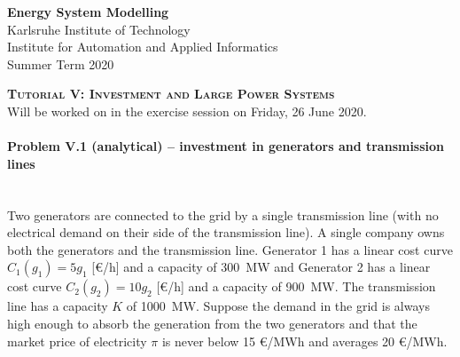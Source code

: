 \documentclass[11pt,a4paper,fleqn]{scrartcl}
\begin{document}
\begin{flushright}
 \textbf{Energy System Modelling }\\
 {\small Karlsruhe Institute of Technology}\\
 {\small Institute for Automation and Applied Informatics}\\
 {\small Summer Term 2020}\\
\end{flushright}

 
 \vspace{-0.5em}
 \hrulefill
 \vspace{0.3em}

\begin{center}
 \textbf{\textsc{\Large Tutorial V: Investment and Large Power Systems}}\\
 \small Will be worked on in the exercise session on Friday, 26 June 2020.\\[1.5em]
\end{center}

\vspace{-0.5em}
\hrulefill
\vspace{0.8em}

\vspace{1em}

\paragraph{Problem V.1 (analytical) -- investment in generators and transmission lines}~\\

Two generators are connected to the grid by a single transmission
line (with no electrical demand on their side of the transmission line). A single company owns both the generators and the transmission line. Generator 1 has a linear cost curve $C_1(g_1) = 5 g_1$ [\euro/h] and a capacity of 300~MW and Generator 2 has a linear cost curve $C_2(g_2) = 10 g_2$ [\euro/h] and a capacity of 900~MW. The transmission line has a capacity $K$ of 1000~MW. Suppose the demand in the grid is always high enough to absorb the
generation from the two generators and that the market price of
electricity $\pi$ is never below 15 \euro/MWh and averages 20
\euro/MWh.
\end{document}
